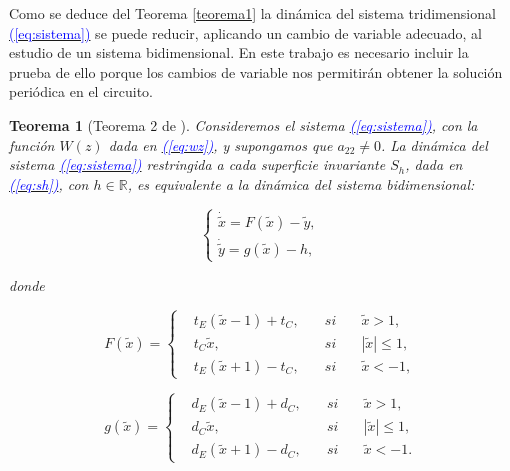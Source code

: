 \documentclass[12pt,a4paper]{report} %
\newtheorem{theorem}{Teorema}[chapter]
\newcommand{\eref}[1]{\hyperref[#1]{\textcolor{blue}{(\ref*{#1})}}}
\newcommand{\eref}[1]{\hyperref[#1]{\textcolor{blue}{\textit{(\ref*{#1})}}}}
\begin{document}
	\vspace{0.5cm}Como se deduce del Teorema \ref{teorema1} la dinámica del sistema tridimensional \eref{eq:sistema} se puede reducir, aplicando un cambio de variable adecuado, al estudio de un sistema bidimensional. En este trabajo es necesario incluir la prueba de ello porque los cambios de variable nos permitirán obtener la solución periódica en el circuito.
	
	\newpage
	
	\begin{theorem}[Teorema 2 de \cite{ponce}]
		Consideremos el sistema \eref{eq:sistema}, con la función $W(z)$ dada en \eref{eq:wz}, y supongamos que $a_{22}\neq 0$. La dinámica del sistema \eref{eq:sistema} restringida a cada superficie invariante $S_h$, dada en \eref{eq:sh}, con $h \in \mathbb{R}$, es equivalente a la dinámica del sistema bidimensional:
		
		\begin{equation}
			\label{eq:sis2ec}
			\left\{
			\begin{gathered}
				\dot{\tilde{x}}=F(\tilde{x})-\tilde{y}, \\[2mm]
				\dot{\tilde{y}}=g(\tilde{x})-h,
			\end{gathered}
			\right.
		\end{equation}
		
		donde
		
		\begin{equation}
			\label{eq:f1}
			F(\tilde{x})=
			\left\{
			\begin{aligned}
				&t_E(\tilde{x}-1)+t_C, \quad &si& \quad \tilde{x}>1,\\
				&t_C\tilde{x}, &si& \quad |\tilde{x}|\leq 1,\\
				&t_E(\tilde{x}+1)-t_C, \quad &si& \quad \tilde{x}<-1,
			\end{aligned}
			\right.
		\end{equation}\smallskip
		
		\begin{equation}
			\label{eq:g1}
			g(\tilde{x})=
			\left\{
			\begin{aligned}
				&d_E(\tilde{x}-1)+d_C, \quad &si& \quad \tilde{x}>1,\\
				&d_C\tilde{x}, &si& \quad |\tilde{x}|\leq 1,\\
				&d_E(\tilde{x}+1)-d_C, \quad &si& \quad \tilde{x}<-1.
			\end{aligned}
			\right.
		\end{equation}\smallskip
		
	\end{theorem}
	
\end{document}

